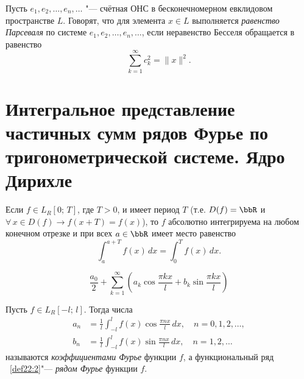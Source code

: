 \begin{defn}
Пусть $e_1, e_2, \ldots, e_n, \ldots$ "--- счётная ОНС в бесконечномерном евклидовом пространстве $L$. Говорят, что для элемента $x \in L$ выполняется \textit{равенство Парсеваля} по системе $e_1, e_2, \ldots, e_n, \ldots$, если неравенство Бесселя обращается в равенство
$$
\sum\limits_{k=1}^{\infty} c_k^2 = \|x\|^2.
$$
\end{defn}


\section{Интегральное представление частичных сумм рядов Фурье по тригонометрической системе. Ядро Дирихле}

\begin{lemm} \label{lm22:7}
Если $f \in L_R[0;\, T]$, где $T > 0$, и имеет период $T$ (т.е. $D(f) = \bbR$ и $\forall\, x \in D(f) \longrightarrow f(x + T) = f(x)$), то $f$ абсолютно интегрируема на любом конечном отрезке и при всех $a \in \bbR$ имеет место равенство
$$
\int_a^{a + T} f(x)\,dx = \int_0^{T} f(x)\,dx.
$$
\end{lemm}

\begin{equation} \label{def22:2}
    \dfrac{a_0}{2} + \sum\limits_{k=1}^{\infty} \left(a_k \cos\dfrac{\pi k x}{l} + b_k \sin\dfrac{\pi k x}{l}\right)
\end{equation}

\begin{defn} \label{df22:9}
Пусть $f \in L_R[-l;\, l]$. Тогда числа
\begin{equation} \label{eq22:4}
\begin{aligned}
a_n &= \frac{1}{l} \int_{-l}^{l} f(x) \cos\frac{\pi n x}{l}\,dx, \quad n = 0, 1, 2, \ldots, \\
b_n &= \frac{1}{l} \int_{-l}^{l} f(x) \sin\frac{\pi n x}{l}\,dx, \quad n = 1, 2, \ldots
\end{aligned}
\end{equation}
называются \textit{коэффициентами Фурье} функции $f$, а функциональный ряд ~\ref{def22:2}"--- \textit{рядом Фурье} функции $f$.
\end{defn}

